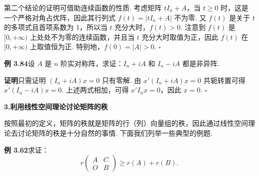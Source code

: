 \documentclass[UTF8,12pt,a4paper,fontset=fandol]{ctexart}
\begin{document}
第二个结论的证明可借助连续函数的性质. 考虑矩阵 $tI_n+A$，当 $t\ge 0$ 时，这是一个严格对角占优阵，因此其行列式 $f(t)=|tI_n+A|$ 不为零. 又 $f(t)$ 是关于 $t$ 的多项式且首项系数为 1，所以当 $t$ 充分大时，$f(t)>0$. 注意到 $f(t)$ 是 $[0,+\infty)$ 上处处不为零的连续函数，并且当 $t$ 充分大时取值为正，因此 $f(t)$ 在 $[0,+\infty)$ 上取值恒为正. 特别地，$f(0)=|A|>0$. $\square$

\noindent\textbf{例 3.84}\quad 设 $A$ 是 $n$ 阶实对称阵，求证：$I_n+iA$ 和 $I_n-iA$ 都是非异阵.

\noindent\textbf{证明}\quad 只需证明 $(I_n+iA)x=0$ 只有零解. 由 $\overline{x'}(I_n+iA)x=0$ 共轭转置可得 $\overline{x'}(I_n-iA)x=0$. 上述两式相加，可得 $\overline{x'}I_nx=0$，因此 $x=0$. $\square$

\noindent\textbf{3.\quad 利用线性空间理论讨论矩阵的秩}

按照最初的定义，矩阵的秩就是矩阵的行（列）向量组的秩，因此通过线性空间理论去讨论矩阵的秩是十分自然的事情. 下面我们列举一些典型的例题.

\noindent\textbf{例 3.62}\quad 求证：
\[
r\begin{pmatrix}A&C\\O&B\end{pmatrix}\ge r(A)+r(B).
\]
\end{document}
